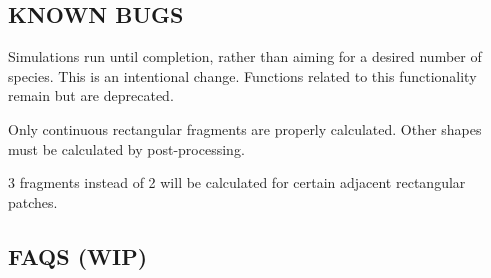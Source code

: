 \subsection*{K\+N\+O\+WN B\+U\+GS}


\begin{DoxyItemize}
\item Simulations run until completion, rather than aiming for a desired number of species. This is an intentional change. Functions related to this functionality remain but are deprecated.
\item Only continuous rectangular fragments are properly calculated. Other shapes must be calculated by post-\/processing.
\item 3 fragments instead of 2 will be calculated for certain adjacent rectangular patches.
\end{DoxyItemize}

\subsection*{F\+A\+QS (W\+IP)}


